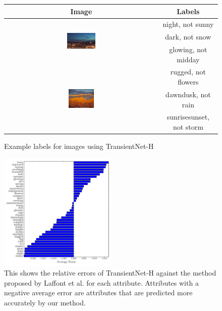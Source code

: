 \documentclass[10pt,twocolumn,letterpaper]{article}
\begin{document}
\begin{figure}[t!]
  \renewcommand{\arraystretch}{1.6}
  \centering
  \begin{tabular}[b]{| c | c |}
    \hline
    Image & Labels \\
    \hline \hline
    \multirow{3}[3]{*}[-2mm]{\includegraphics[width=0.19\textwidth]{figs/labels_1.jpg}}
      & night, not sunny \bigstrut \\
      & dark, not snow \bigstrut  \\
      & glowing, not midday \bigstrut  \\
    \hline
    \multirow{3}[3]{*}[-1mm]{\includegraphics[width=0.17\textwidth]{figs/labels_2.jpg}}
      & rugged, not flowers \bigstrut  \\
      & dawndusk, not rain \bigstrut  \\
      & sunrisesunset, not storm  \bigstrut \\
    \hline
  \end{tabular}
  \caption{Example labels for images using TransientNet-H}
  \label{fig:labels}
\end{figure}

\begin{figure}[t!]
	\centering
		\includegraphics[width=0.5\textwidth]{figs/rel_err_cmr.pdf}
		\caption{This shows the relative errors of TransientNet-H against the method 
						 proposed by Laffont et al. for each attribute.  Attributes with a 
						 negative average error are attributes that are predicted more 
						 accurately by our method.}
		\label{fig:relerr}
\end{figure}
\end{document}
